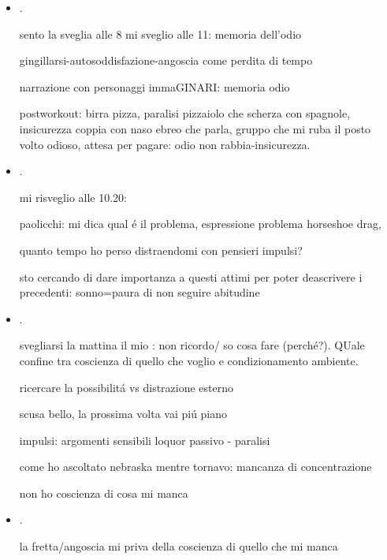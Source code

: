 \begin{itemize}
: mi sveglio alle dieci, mi sono addormentato in macchina e montato tenda alle 6 - cerco come essere me oltre impulsi (fame bello paura rabbia) bias-abitudine (come leggo, come loquor, quale condizione in quale situazione 

\item {}.

sento la sveglia alle 8 mi sveglio alle 11: memoria dell'odio

gingillarsi-autosoddisfazione-angoscia come perdita di tempo

narrazione con personaggi immaGINARI: memoria odio

postworkout: birra pizza, paralisi pizzaiolo che scherza con spagnole, insicurezza coppia con naso ebreo che parla, gruppo che mi ruba il posto volto odioso, attesa per pagare: odio non rabbia-insicurezza.

\item {}.

mi risveglio alle 10.20: 

paolicchi: mi dica qual \'e il problema, espressione problema horseshoe drag, 

quanto tempo ho perso distraendomi con pensieri impulsi?

sto cercando di dare importanza a questi attimi per poter deascrivere i precedenti: sonno=paura di non seguire abitudine

\item {}.

svegliarsi la mattina il mio : non ricordo/ so cosa fare (perch\'e?). QUale confine tra coscienza di quello che voglio e condizionamento ambiente.

ricercare la possibilit\'a vs distrazione esterno

scusa bello, la prossima volta vai pi\'u piano

impulsi: argomenti sensibili loquor passivo - paralisi

come ho ascoltato nebraska mentre tornavo: mancanza di concentrazione

non ho coscienza di cosa mi manca

\item {}.

la fretta/angoscia mi priva della coscienza di quello che mi manca


\end{itemize}
